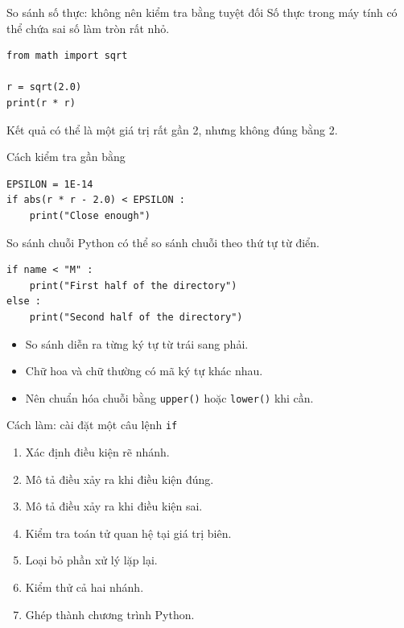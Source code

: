 \documentclass[aspectratio=169,11pt]{beamer}
\newcommand{\code}[1]{\texttt{#1}}
\newcommand{\smallgap}{\vspace{0.4em}}
\begin{document}
\begin{frame}[fragile]{So sánh số thực: không nên kiểm tra bằng tuyệt đối}
Số thực trong máy tính có thể chứa sai số làm tròn rất nhỏ.
\begin{lstlisting}[style=py]
from math import sqrt

r = sqrt(2.0)
print(r * r)
\end{lstlisting}
\smallgap
Kết quả có thể là một giá trị rất gần 2, nhưng không đúng bằng 2.
\smallgap
\begin{exampleblock}{Cách kiểm tra gần bằng}
\begin{lstlisting}[style=py]
EPSILON = 1E-14
if abs(r * r - 2.0) < EPSILON :
    print("Close enough")
\end{lstlisting}
\end{exampleblock}
\end{frame}

\begin{frame}[fragile]{So sánh chuỗi}
Python có thể so sánh chuỗi theo thứ tự từ điển.
\begin{lstlisting}[style=py]
if name < "M" :
    print("First half of the directory")
else :
    print("Second half of the directory")
\end{lstlisting}
\begin{itemize}
  \item So sánh diễn ra từng ký tự từ trái sang phải.
  \item Chữ hoa và chữ thường có mã ký tự khác nhau.
  \item Nên chuẩn hóa chuỗi bằng \code{upper()} hoặc \code{lower()} khi cần.
\end{itemize}
\end{frame}

\begin{frame}{Cách làm: cài đặt một câu lệnh \texttt{if}}
\begin{enumerate}
  \item Xác định điều kiện rẽ nhánh.
  \item Mô tả điều xảy ra khi điều kiện đúng.
  \item Mô tả điều xảy ra khi điều kiện sai.
  \item Kiểm tra toán tử quan hệ tại giá trị biên.
  \item Loại bỏ phần xử lý lặp lại.
  \item Kiểm thử cả hai nhánh.
  \item Ghép thành chương trình Python.
\end{enumerate}
\end{frame}
\end{document}
